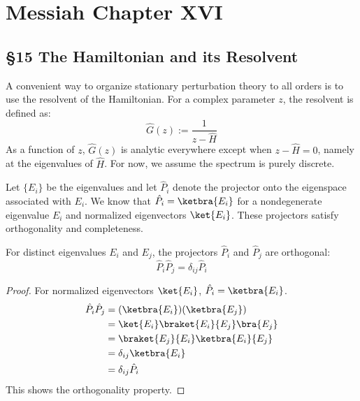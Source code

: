 \hr
\section{Messiah Chapter XVI}
\subsection{§15 The Hamiltonian and its Resolvent}
\begin{note}
    A convenient way to organize stationary perturbation theory to
    all orders is to use the resolvent of the Hamiltonian. For a
    complex parameter $z$, the resolvent is defined as:
    \begin{equation} \label{eq:resolvent_definition}
        \hat G(z):=\frac{1}{z-\hat H}
    \end{equation}
    As a function of $z$, $\hat G(z)$ is analytic everywhere except
    when $z - \hat H = 0$, namely at the eigenvalues of $\hat H$. For
    now, we assume the spectrum is purely discrete.
\end{note}

Let $\{E_i\}$ be the eigenvalues and let $\hat P_i$ denote the
projector onto the eigenspace associated with $E_i$. We know that
$\hat P_i = \ketbra{E_i}$ for a nondegenerate eigenvalue $E_i$ and
normalized eigenvectors $\ket{E_i}$. These projectors satisfy
orthogonality and completeness.

\begin{lemma}
    For distinct eigenvalues $E_i$ and $E_j$, the projectors $\hat
    P_i$ and $\hat P_j$ are orthogonal:
    \begin{equation} \label{eq:projector_orthogonality}
        \hat P_i \hat P_j= \delta_{ij} \hat P_i
    \end{equation}
\end{lemma}
\begin{proof}
    For normalized eigenvectors $\ket{E_i}$, $\hat P_i = \ketbra{E_i}$.
    \begin{align}
        \hat P_i \hat P_j &= (\ketbra {E_i})(\ketbra {E_j}) \\
        &= \ket{E_i} \braket{E_i} {E_j} \bra {E_j} \notag \\
        &= \braket{E_j} {E_i} \ketbra {E_i} {E_j} \notag \\
        &= \delta_{ij} \ketbra {E_i} \notag \\
        &= \delta_{ij} \hat P_i \notag
    \end{align}
    This shows the orthogonality property.
\end{proof}

